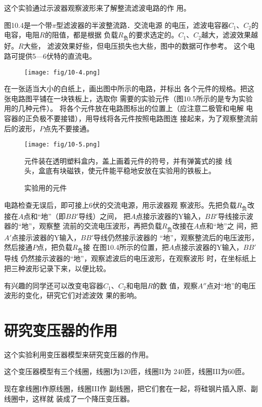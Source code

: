 这个实验通过示波器观察波形来了解整流滤波电路的作
用。

图10.4是一个带$\pi$型滤波器的半波整流路．交流电源
的电压，滤波电容器$C_1$、$C_2$的电容，电阻$R$的阻值，都是根据
负载$R_{\text{负}}$的要求选定的。$C_1$、$C_2$越大，滤波效果越好。$R$大些，
滤波效果好些，但电压损失也大些，图中的数据可作参考。
这个电路可提供5—6伏特的直流电。
\begin{figure}[htp]\centering
    \texttt{[image: fig/10-4.png]}
    \caption{}
    \end{figure}

在一张适当大小的白纸上，画出图中所示的电路，并标出
各个元件的规格。把这张电路图平铺在一块铁板上，选取你
需要的实验元件（图10.5所示的是专为实验用的几种元件）。
将各个元件放在电路图标出的位置上（应注意二极管和电解
电容器的正负极不要接错），用导线将各元件按照电路图连
接起来，为了观察整流前后的波形，$P$点先不要接通。

\begin{figure}[htp]\centering
    \texttt{[image: fig/10-5.png]}

    元件装在透明塑料盒内，盖上画着元件的符号，并有弹簧式的接
线头，盒底有块磁铁，使元件能平稳地安放在实验用的铁板上。
    \caption{实验用的元件}
    \end{figure}

电路检查无误后，即可接上6伏的交流电源，用示波器观
察波形。先把负载$R_{\text{负}}$改接在$A$点和“地”（即$BB'$导线）之间，
把$A$点接示波器的Y输入，$BB'$导线接示波器的“地”，观察整
流前的交流电压波形，再把负载$R_{\text{负}}$改接在$A$点和“地”之
间，把$A'$点接示波器的Y输入，$BB'$导线仍然接示波器的
“地”，观察整流后的电压波形，然后接通$P$点，把负载$R_{\text{负}}$接
在图10.4所示的位置，把$A$点接示波器的Y输入，$BB'$导线
仍然接示波器的“地”，观察滤波后的电压波形，在观察波形
时，在坐标纸上把三种波形记录下来，以便比较。

有兴趣的同学还可以改变电容器$C_1$、$C_2$和电阻$R$的数
值，观察$A''$点对“地”的电压波形的变化，研究它们对滤波效
果的影响。

\section{研究变压器的作用}
这个实验利用变压器模型来研究变压器的作用。

这个变压器模型有三个线圈，线圈I为120匝，线圈II为
240匝，线圈III为60匝。

现在拿线圈I作原线圈，线圈III作
副线圈，把它们套在一起，将硅钢片插入原、副线圈中，这样就
装成了一个降压变压器。


